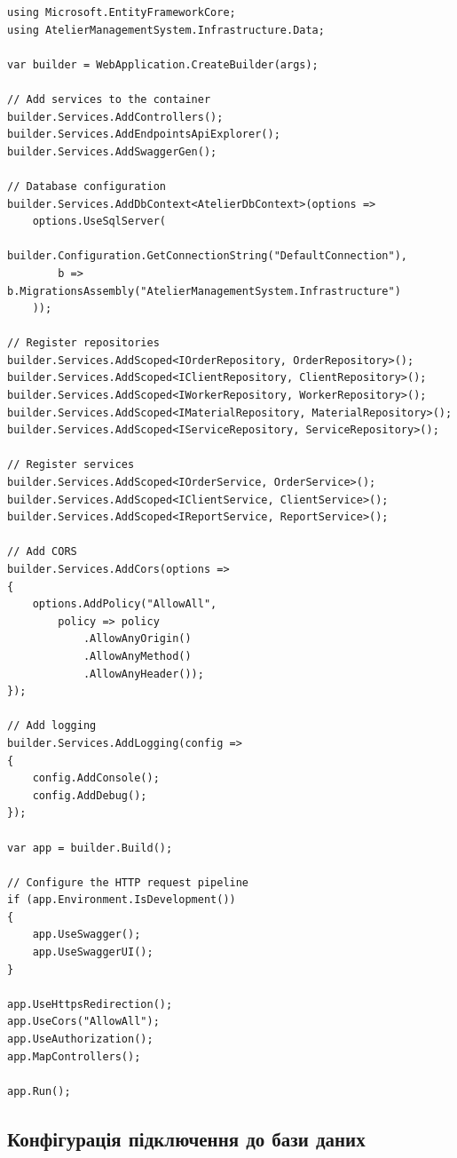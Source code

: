\documentclass[14pt,a4paper]{extarticle}
\begin{document}
\begin{lstlisting}[language={[Sharp]C}, caption=Конфігурація сервісів у Program.cs, basicstyle=\small\ttfamily, breaklines=true, frame=single]
using Microsoft.EntityFrameworkCore;
using AtelierManagementSystem.Infrastructure.Data;

var builder = WebApplication.CreateBuilder(args);

// Add services to the container
builder.Services.AddControllers();
builder.Services.AddEndpointsApiExplorer();
builder.Services.AddSwaggerGen();

// Database configuration
builder.Services.AddDbContext<AtelierDbContext>(options =>
    options.UseSqlServer(
        builder.Configuration.GetConnectionString("DefaultConnection"),
        b => b.MigrationsAssembly("AtelierManagementSystem.Infrastructure")
    ));

// Register repositories
builder.Services.AddScoped<IOrderRepository, OrderRepository>();
builder.Services.AddScoped<IClientRepository, ClientRepository>();
builder.Services.AddScoped<IWorkerRepository, WorkerRepository>();
builder.Services.AddScoped<IMaterialRepository, MaterialRepository>();
builder.Services.AddScoped<IServiceRepository, ServiceRepository>();

// Register services
builder.Services.AddScoped<IOrderService, OrderService>();
builder.Services.AddScoped<IClientService, ClientService>();
builder.Services.AddScoped<IReportService, ReportService>();

// Add CORS
builder.Services.AddCors(options =>
{
    options.AddPolicy("AllowAll",
        policy => policy
            .AllowAnyOrigin()
            .AllowAnyMethod()
            .AllowAnyHeader());
});

// Add logging
builder.Services.AddLogging(config =>
{
    config.AddConsole();
    config.AddDebug();
});

var app = builder.Build();

// Configure the HTTP request pipeline
if (app.Environment.IsDevelopment())
{
    app.UseSwagger();
    app.UseSwaggerUI();
}

app.UseHttpsRedirection();
app.UseCors("AllowAll");
app.UseAuthorization();
app.MapControllers();

app.Run();
\end{lstlisting}

\newpage
\subsection{Конфігурація підключення до бази даних}
\end{document}
